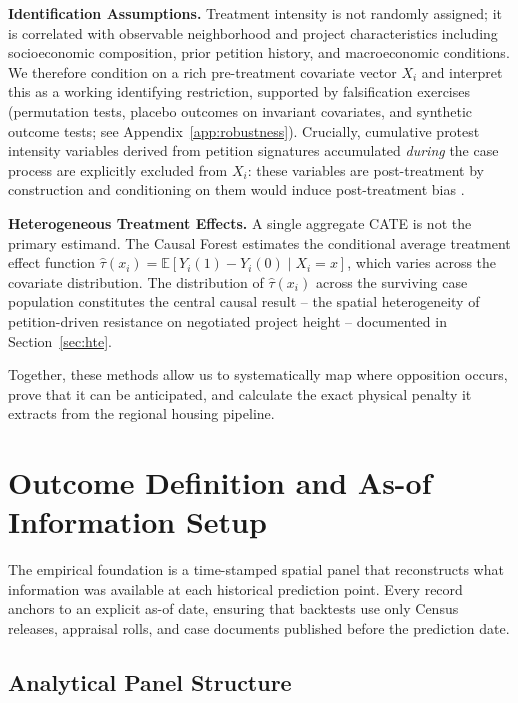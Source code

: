 \documentclass[11pt, letterpaper, oneside]{article}
\begin{document}
\textbf{Identification Assumptions.} Treatment intensity is not randomly assigned; it is correlated with observable neighborhood and project characteristics including socioeconomic composition, prior petition history, and macroeconomic conditions. We therefore condition on a rich pre-treatment covariate vector $X_i$ and interpret this as a working identifying restriction, supported by falsification exercises (permutation tests, placebo outcomes on invariant covariates, and synthetic outcome tests; see Appendix~\ref{app:robustness}). Crucially, cumulative protest intensity variables derived from petition signatures accumulated \emph{during} the case process are explicitly excluded from $X_i$: these variables are post-treatment by construction and conditioning on them would induce post-treatment bias \citep{angrist1996identification}.

\textbf{Heterogeneous Treatment Effects.} A single aggregate CATE is not the primary estimand. The Causal Forest estimates the conditional average treatment effect function $\hat{\tau}(x_i) = \mathbb{E}[Y_i(1) - Y_i(0) \mid X_i = x]$, which varies across the covariate distribution. The distribution of $\hat{\tau}(x_i)$ across the surviving case population constitutes the central causal result -- the spatial heterogeneity of petition-driven resistance on negotiated project height -- documented in Section~\ref{sec:hte}.

Together, these methods allow us to systematically map where opposition occurs, prove that it can be anticipated, and calculate the exact physical penalty it extracts from the regional housing pipeline.

\section{Outcome Definition and As-of Information Setup}

The empirical foundation is a time-stamped spatial panel that reconstructs what information was available at each historical prediction point. Every record anchors to an explicit as-of date, ensuring that backtests use only Census releases, appraisal rolls, and case documents published before the prediction date.

\subsection{Analytical Panel Structure}
\end{document}
